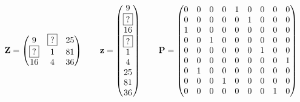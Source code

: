 \begin{figure}[H]
	\[
	\mathbf{Z} = \left(
		\begin{matrix}
			9 & \boxed{?} & 25\\
			\boxed{?} &  1 & 81\\
			16 &  4 & 36\\
		\end{matrix}
	\right)
	\qquad
	\mathbf{z} = \left(
		\begin{matrix}
			9 \\ \boxed{?} \\ 16 \\ \boxed{?} \\ 1 \\ 4 \\ 25 \\ 81 \\ 36\\
		\end{matrix}
	\right)
	\qquad
	\mathbf{P} = \left(
		\begin{matrix}
			0&0&0&0&1&0&0&0&0\\
			0&0&0&0&0&1&0&0&0\\
			1&0&0&0&0&0&0&0&0\\
			0&0&1&0&0&0&0&0&0\\
			0&0&0&0&0&0&1&0&0\\
			0&0&0&0&0&0&0&0&1\\
			0&1&0&0&0&0&0&0&0\\
			0&0&0&1&0&0&0&0&0\\
			0&0&0&0&0&0&0&1&0\\
		\end{matrix}
	\right)
	\]
\end{figure}
